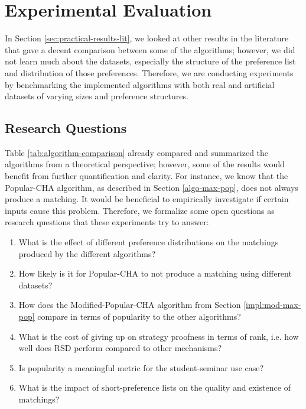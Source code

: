 \section{Experimental Evaluation}\label{sec:evaluation}
In Section \ref{sec:practical-results-lit}, we looked at other results in the literature that gave a decent comparison between some of the algorithms; however, we did not learn much about the datasets, especially the structure of the preference list and distribution of those preferences. Therefore, we are conducting experiments by benchmarking the implemented algorithms with both real and artificial datasets of varying sizes and preference structures.

\subsection{Research Questions}\label{sec:research-q}
Table \ref{tab:algorithm-comparison} already compared and summarized the algorithms from a theoretical perspective; however, some of the results would benefit from further quantification and clarity. For instance, we know that the Popular-CHA algorithm, as described in Section \ref{algo-max-pop}, does not always produce a matching. It would be beneficial to empirically investigate if certain inputs cause this problem. Therefore, we formalize some open questions as research questions that these experiments try to answer:
\begin{enumerate}
    \item What is the effect of different preference distributions on the matchings produced by the different algorithms?
    \item How likely is it for Popular-CHA to not produce a matching using different datasets?
    \item How does the Modified-Popular-CHA algorithm from Section \ref{impl:mod-max-pop} compare in terms of popularity to the other algorithms?
    \item What is the cost of giving up on strategy proofness in terms of rank, i.e. how well does RSD perform compared to other mechanisms?
    \item Is popularity a meaningful metric for the student-seminar use case?
    \item What is the impact of short-preference lists on the quality and existence of matchings?
\end{enumerate}

